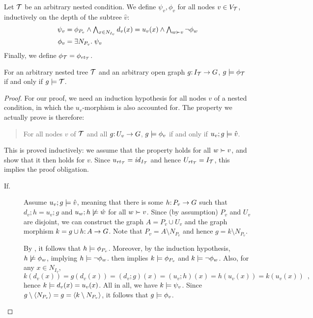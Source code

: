 Let ${\mathcal{T}}$ be an arbitrary nested condition. We define $\psi_v,\phi_v$ for all nodes $v\in V_{\mathcal{T}}$, inductively on the depth of the subtree $\hat v$:
%
\begin{align}
\psi_v = {} & \textstyle \phi_{P_v}\wedge \bigwedge_{x\in N_{I_v}} d_v(x)=u_v(x) \wedge \bigwedge_{w\childof v} \neg\phi_w \label{eq:psi} \\
\phi_v = {} & \exists N_{P_v}\st \psi_v
\end{align}
%
Finally, we define $\phi_{\mathcal{T}}=\phi_{\mathit{rt}_{{\mathcal{T}}}}$.
%
\begin{theorem}
For an arbitrary nested tree ${\mathcal{T}}$ and an arbitrary open graph $g{:}\, I_{\mathcal{T}}\rightarrow G$, $g\models\phi_{\mathcal{T}}$ if and only if $g\models{\mathcal{T}}$.
\end{theorem}
%
\begin{proof}
For our proof, we need an induction hypothesis for all nodes $v$ of a nested condition, in which the $u_v$-morphism is also accounted for. The property we actually prove is therefore:
\begin{quote}
For all nodes $v$ of ${\mathcal{T}}$ and all $g{:}\, U_v\rightarrow G$, $g\models \phi_v$ if and only if $u_v;g\models \hat v$.
\end{quote}
This is proved inductively: we assume that the property holds for all $w\childof v$, and show that it then holds for $v$. Since $u_{\mathit{rt}_{{\mathcal{T}}}}={\mathit{id}}_{I_{\mathcal{T}}}$ and hence $U_{\mathit{rt}_{{\mathcal{T}}}}=I_{\mathcal{T}}$, this implies the proof obligation.
%
\begin{description}
\item[If.] Assume $u_v;g\models \hat v$, meaning that there is some $h{:}\, P_v\rightarrow G$ such that $d_v;h=u_v;g$ and $u_w;h\not\models \hat w$ for all $w\childof v$. Since (by assumption) $P_v$ and $U_v$ are disjoint, we can construct the graph $A=P_v\cup U_v$ and the graph morphism $k=g\cup h{:}\, A\rightarrow G$. Note that $P_v=A\setminus N_{P_v}$ and hence $g=k\setminus N_{P_v}$.

\smallskip
By , it follows that $h\models \phi_{P_v}$. Moreover, by the induction hypothesis, $h\not\models \phi_w$, implying $h\models\neg \phi_w$.  then implies $k\models \phi_{P_v}$ and $k\models \neg\phi_w$. Also, for any $x\in N_{I_v}$,
\[ k(d_v(x))=g(d_v(x))=(d_v;g)(x) = (u_v;h)(x) = h(u_v(x))=k(u_v(x)) \enspace, \]
hence $k\models d_v(x)=u_v(x)$. All in all, we have $k\models \psi_v$. Since $g\setminus \langle N_{P_v}\rangle= g= \langle k\setminus N_{P_v}\rangle$, it follows that $g\models \phi_v$.


\end{description}
\end{proof}
